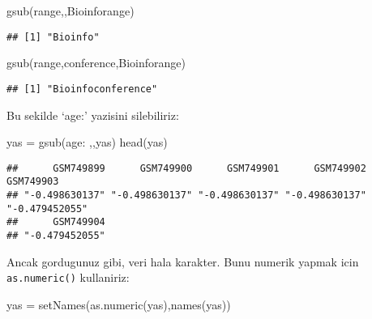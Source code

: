 \documentclass[
]{book}
\newenvironment{Shaded}{\begin{snugshade}}{\end{snugshade}}
\newcommand{\FunctionTok}[1]{\textcolor[rgb]{0.00,0.00,0.00}{#1}}
\newcommand{\NormalTok}[1]{#1}
\newcommand{\OtherTok}[1]{\textcolor[rgb]{0.56,0.35,0.01}{#1}}
\newcommand{\StringTok}[1]{\textcolor[rgb]{0.31,0.60,0.02}{#1}}
\begin{document}
\begin{Shaded}
\begin{Highlighting}[]
\FunctionTok{gsub}\NormalTok{(}\StringTok{\textquotesingle{}range\textquotesingle{}}\NormalTok{,}\StringTok{\textquotesingle{}\textquotesingle{}}\NormalTok{,}\StringTok{\textquotesingle{}Bioinforange\textquotesingle{}}\NormalTok{)}
\end{Highlighting}
\end{Shaded}

\begin{verbatim}
## [1] "Bioinfo"
\end{verbatim}

\begin{Shaded}
\begin{Highlighting}[]
\FunctionTok{gsub}\NormalTok{(}\StringTok{\textquotesingle{}range\textquotesingle{}}\NormalTok{,}\StringTok{\textquotesingle{}conference\textquotesingle{}}\NormalTok{,}\StringTok{\textquotesingle{}Bioinforange\textquotesingle{}}\NormalTok{)}
\end{Highlighting}
\end{Shaded}

\begin{verbatim}
## [1] "Bioinfoconference"
\end{verbatim}

Bu sekilde `age:' yazisini silebiliriz:

\begin{Shaded}
\begin{Highlighting}[]
\NormalTok{yas }\OtherTok{=} \FunctionTok{gsub}\NormalTok{(}\StringTok{\textquotesingle{}age: \textquotesingle{}}\NormalTok{,}\StringTok{\textquotesingle{}\textquotesingle{}}\NormalTok{,yas)}
\FunctionTok{head}\NormalTok{(yas)}
\end{Highlighting}
\end{Shaded}

\begin{verbatim}
##      GSM749899      GSM749900      GSM749901      GSM749902      GSM749903 
## "-0.498630137" "-0.498630137" "-0.498630137" "-0.498630137" "-0.479452055" 
##      GSM749904 
## "-0.479452055"
\end{verbatim}

Ancak gordugunuz gibi, veri hala karakter. Bunu numerik yapmak icin \texttt{as.numeric()} kullaniriz:

\begin{Shaded}
\begin{Highlighting}[]
\NormalTok{yas }\OtherTok{=} \FunctionTok{setNames}\NormalTok{(}\FunctionTok{as.numeric}\NormalTok{(yas),}\FunctionTok{names}\NormalTok{(yas))}
\end{Highlighting}
\end{Shaded}
\end{document}
